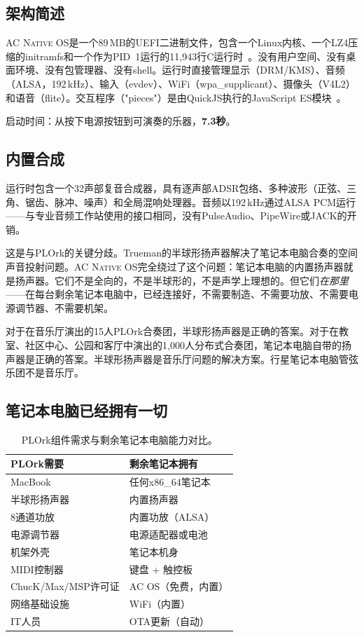 \documentclass[10pt,letterpaper,twocolumn]{article}
\newcommand{\acos}{\textsc{AC Native OS}}
\begin{document}
\subsection{架构简述}

\acos{}是一个89\,MB的UEFI二进制文件，包含一个Linux内核、一个LZ4压缩的initramfs和一个作为PID~1运行的11,943行C运行时~\citep{scudder2026os}。没有用户空间、没有桌面环境、没有包管理器、没有shell。运行时直接管理显示（DRM/KMS）、音频（ALSA，192\,kHz）、输入（evdev）、WiFi（wpa\_supplicant）、摄像头（V4L2）和语音（flite）。交互程序（"pieces"）是由QuickJS执行的JavaScript ES模块~\citep{bellard2019quickjs}。

启动时间：从按下电源按钮到可演奏的乐器，\textbf{7.3秒}。

\subsection{内置合成}

运行时包含一个32声部复音合成器，具有逐声部ADSR包络、多种波形（正弦、三角、锯齿、脉冲、噪声）和全局混响处理器。音频以192\,kHz通过ALSA PCM运行——与专业音频工作站使用的接口相同，没有PulseAudio、PipeWire或JACK的开销。

这是与PLOrk的关键分歧。Trueman的半球形扬声器解决了笔记本电脑合奏的空间声音投射问题。\acos{}完全绕过了这个问题：笔记本电脑的内置扬声器就是扬声器。它们不是全向的，不是半球形的，不是声学上理想的。但它们\emph{在那里}——在每台剩余笔记本电脑中，已经连接好，不需要制造、不需要功放、不需要电源调节器、不需要机架。

对于在音乐厅演出的15人PLOrk合奏团，半球形扬声器是正确的答案。对于在教室、社区中心、公园和客厅中演出的1,000人分布式合奏团，笔记本电脑自带的扬声器是正确的答案。半球形扬声器是音乐厅问题的解决方案。行星笔记本电脑管弦乐团不是音乐厅。

\subsection{笔记本电脑已经拥有一切}

\begin{table}[h]
\small
\centering
\begin{tabular}{ll}
\toprule
\textbf{PLOrk需要} & \textbf{剩余笔记本拥有} \\
\midrule
MacBook & 任何x86\_64笔记本 \\
半球形扬声器 & 内置扬声器 \\
8通道功放 & 内置功放（ALSA） \\
电源调节器 & 电源适配器或电池 \\
机架外壳 & 笔记本机身 \\
MIDI控制器 & 键盘 + 触控板 \\
ChucK/Max/MSP许可证 & AC OS（免费，内置） \\
网络基础设施 & WiFi（内置） \\
IT人员 & OTA更新（自动） \\
\bottomrule
\end{tabular}
\caption{PLOrk组件需求与剩余笔记本电脑能力对比。}
\label{tab:plork-vs-surplus}
\end{table}
\end{document}
